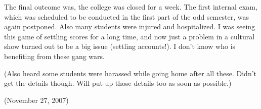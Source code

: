 {The final outcome was, the college was closed for a week. The first internal exam, which was scheduled to be conducted in the first part of the odd semester, was again postponed. Also many students were injured and hospitalized. I was seeing this game of settling scores for a long time, and now just a problem in a cultural show turned out to be a big issue (settling accounts!). I don’t know who is benefiting from these gang wars.

(Also heard some students were harassed while going home after all these. Didn't get the details though. Will put up those details too as soon as possible.)

(November 27, 2007)
}
\newpage
